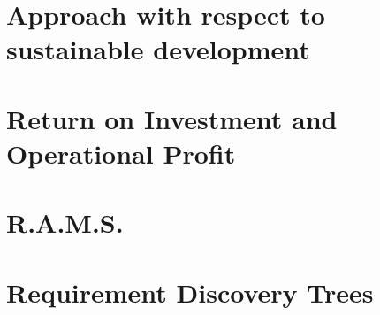 \documentclass[11pt]{report}
\begin{document}
\chapter{Approach with respect to sustainable development}
\label{blSustainable}





%
%

\chapter{Return on Investment and Operational Profit}
\label{blInvestment}

%
%

\chapter{R.A.M.S.}
\label{blRAMS1}


%
%




%
%

\appendix
\chapter{Requirement Discovery Trees}
\label{reqdisctree}
\end{document}
